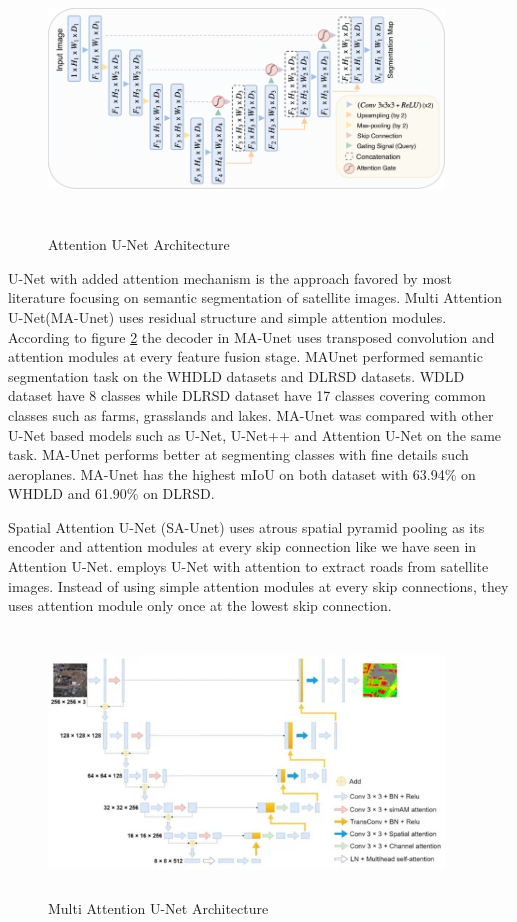 \begin{figure}[ht]
\includegraphics[width=10.5cm, height=7cm]{images/attention-unet.png}
\centering
\caption{Attention U-Net Architecture \protect\cite{attention-unet}}
\label{fig:attention-unet}
\end{figure}

U-Net with added attention mechanism is the approach favored by most literature focusing on semantic segmentation of satellite images. Multi Attention U-Net(MA-Unet) \cite{multi-attention-unet}  uses residual structure and simple attention modules. According to figure \ref{fig:maunet} the decoder in MA-Unet uses transposed convolution and attention modules at every feature fusion stage. MAUnet performed semantic segmentation task on the WHDLD datasets and DLRSD datasets. WDLD dataset have 8 classes while DLRSD dataset have 17 classes covering common classes such as farms, grasslands and lakes. MA-Unet was compared with other U-Net based models such as U-Net, U-Net++ and Attention U-Net on the same task. MA-Unet performs better at segmenting classes with fine details such aeroplanes. MA-Unet has the highest mIoU on both dataset with 63.94\% on WHDLD and 61.90\% on DLRSD.

Spatial Attention U-Net (SA-Unet) \cite{improved-unet} uses atrous spatial pyramid pooling as its encoder and attention modules at every skip connection like we have seen in Attention U-Net.  \cite{attention-unet-road} employs U-Net with attention to extract roads from satellite images. Instead of using simple attention modules at every skip connections, they uses attention module only once at the lowest skip connection.

\begin{figure}[ht]
\includegraphics[width=10.5cm, height=7cm]{images/maunet.png}
\centering
\caption{Multi Attention U-Net Architecture \protect\cite{multi-attention-unet}}
\label{fig:maunet}
\end{figure}

